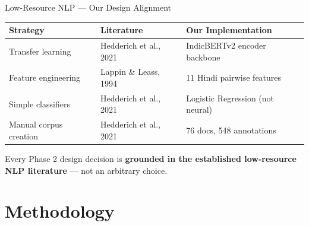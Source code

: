 \documentclass[aspectratio=169]{beamer}
\begin{document}
\begin{frame}{Low-Resource NLP — Our Design Alignment}
  \vspace{2pt}
  \begin{tcolorbox}[nbox={Strategy $\longleftrightarrow$ Our Implementation}]
    \small
    \renewcommand{\arraystretch}{1.5}
    \begin{tabular}{p{3.5cm} p{3.8cm} p{4.0cm}}
      \toprule
      \textbf{Strategy} & \textbf{Literature} & \textbf{Our Implementation}\\
      \midrule
      Transfer learning & Hedderich et al., 2021 & IndicBERTv2 encoder backbone\\
      Feature engineering & Lappin \& Leass, 1994 & 11 Hindi pairwise features\\
      Simple classifiers & Hedderich et al., 2021 & Logistic Regression (not neural)\\
      Manual corpus creation & Hedderich et al., 2021 & 76 docs, 548 annotations\\
      \bottomrule
    \end{tabular}
  \end{tcolorbox}

  \vspace{8pt}
  \begin{tcolorbox}[rbox={Design Philosophy}]
    Every Phase 2 design decision is \textbf{grounded in the
    established low-resource NLP literature} — not an arbitrary choice.
  \end{tcolorbox}
\end{frame}


\section{Methodology}
\end{document}
